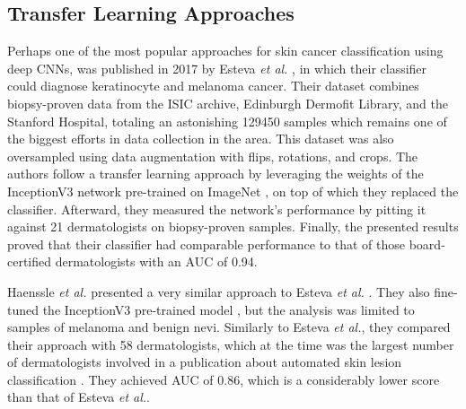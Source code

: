 \subsection{Transfer Learning Approaches}
\label{section:skin_transfer_learning}
    Perhaps one of the most popular approaches for skin cancer classification using deep \ac{CNN}s, was published in 2017 by Esteva \textit{et al.} \cite{Esteva2017}, in which their classifier could diagnose keratinocyte and melanoma cancer. Their dataset combines biopsy-proven data from the \ac{ISIC} archive, Edinburgh Dermofit Library, and the Stanford Hospital, totaling an astonishing 129450 samples which remains one of the biggest efforts in data collection in the area. This dataset was also oversampled using data augmentation with flips, rotations, and crops. The authors follow a transfer learning approach by leveraging the weights of the InceptionV3 \cite{inceptionv3} network pre-trained on ImageNet \cite{Deng2010}, on top of which they replaced the classifier. Afterward, they measured the network's performance by pitting it against 21 dermatologists on biopsy-proven samples. Finally, the presented results proved that their classifier had comparable performance to that of those board-certified dermatologists with an \ac{AUC} of 0.94.\par
    
    Haenssle \textit{et al.} \cite{Haenssle2018} presented a very similar approach to Esteva \textit{et al.} \cite{Esteva2017}. They also fine-tuned the InceptionV3 pre-trained model \cite{inceptionv3}, but the analysis was limited to samples of melanoma and benign nevi. Similarly to Esteva \textit{et al.}, they compared their approach with 58 dermatologists, which at the time was the largest number of dermatologists involved in a publication about automated skin lesion classification \cite{Brinker2018}. They achieved \ac{AUC} of 0.86, which is a considerably lower score than that of Esteva \textit{et al.}. \par
    
